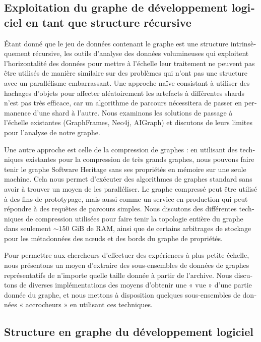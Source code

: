 \begin{otherlanguage}{french}
\subsection*{Exploitation du graphe de développement logiciel en tant que
structure récursive}

Étant donné que le jeu de données contenant le graphe est une structure
intrinsèquement récursive, les outils d'analyse des données volumineuses qui
exploitent l'horizontalité des données pour mettre à l'échelle leur traitement
ne peuvent pas être utilisés de manière similaire sur des problèmes qui n'ont
pas une structure avec un parallélisme embarrassant. Une approche naïve
consistant à utiliser des hachages d'objets pour affecter aléatoirement les
artefacts à différentes shards n'est pas très efficace, car un algorithme de
parcours nécessitera de passer en permanence d'une shard à l'autre. Nous
examinons les solutions de passage à l'échelle existantes (GraphFrames, Neo4j,
AIGraph) et discutons de leurs limites pour l'analyse de notre graphe.

Une autre approche est celle de la compression de graphes : en utilisant des
techniques existantes pour la compression de très grands graphes, nous pouvons
faire tenir le graphe Software Heritage sans ses propriétés en mémoire sur une
seule machine. Cela nous permet d'exécuter des algorithmes de graphes standard
sans avoir à trouver un moyen de les paralléliser. Le graphe compressé peut
être utilisé à des fins de prototypage, mais aussi comme un service en
production qui peut répondre à des requêtes de parcours simples. Nous discutons
des différentes techniques de compression utilisées pour faire tenir la
topologie entière du graphe dans seulement $\sim150$ GiB de RAM, ainsi que de
certains arbitrages de stockage pour les métadonnées des nœuds et des bords du
graphe de propriétés.

Pour permettre aux chercheurs d'effectuer des expériences à plus petite
échelle, nous présentons un moyen d'extraire des sous-ensembles de données de
graphes représentatifs de n'importe quelle taille donnée à partir de l'archive.
Nous discutons de diverses implémentations des moyens d'obtenir une « vue »
d'une partie donnée du graphe, et nous mettons à disposition quelques
sous-ensembles de données « accrocheurs » en utilisant ces techniques.

\subsection*{Structure en graphe du développement logiciel}


\end{otherlanguage}
